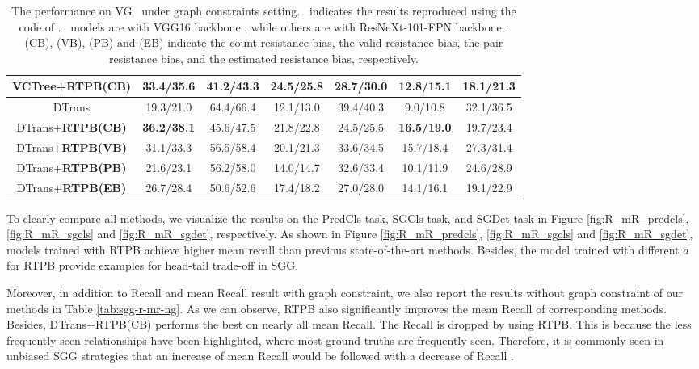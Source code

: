 \begin{table}[!ht]
\begin{tabular}{c|cc|cc|cc}
		VCTree+\textbf{RTPB(CB)  }               & 33.4/35.6     & 41.2/43.3    &\textbf{ 24.5/25.8}    & 28.7/30.0   & 12.8/15.1    & 18.1/21.3   \\ \hline
		DTrans                         & 19.3/21.0     & 64.4/66.4    & 12.1/13.0    & 39.4/40.3   & 9.0/10.8     & 32.1/36.5   \\
		DTrans+\textbf{RTPB(CB) }                & \textbf{36.2/38.1}    & 45.6/47.5    & 21.8/22.8    & 24.5/25.5   & \textbf{16.5/19.0}    & 19.7/23.4   \\
		DTrans+\textbf{RTPB(VB)}   & 31.1/33.3                    & 56.5/58.4                  & 20.1/21.3                 & 33.6/34.5 & 15.7/18.4 & 27.3/31.4 \\
		DTrans+\textbf{RTPB(PB)}         & 21.6/23.1        & 56.2/58.0       & 14.0/14.7    & 32.6/33.4   & 10.1/11.9    & 24.6/28.9   \\
		DTrans+\textbf{RTPB(EB)}                 & 26.7/28.4     & 50.6/52.6    & 17.4/18.2    & 27.0/28.0   & 14.1/16.1    & 19.1/22.9   \\
		
		\hline
	\end{tabular}
	\caption{ The performance on VG~\cite{krishna2016visual} under graph constraints setting. \dag~indicates the results reproduced using the code of \cite{Tang2020_unbiased}. \ddag~models are with VGG16 backbone \cite{simonyan2014very}, while others are with ResNeXt-101-FPN backbone \cite{Lin_2017_ICCV}. (CB), (VB), (PB) and (EB) indicate the count resistance bias, the valid resistance bias, the pair resistance bias, and the estimated resistance bias, respectively.}
	\label{tab:sgg-r-mr}
\end{table}
To clearly compare all methods, we visualize the results on the PredCls task, SGCls task, and SGDet task in Figure \ref{fig:R_mR_predcls}, \ref{fig:R_mR_sgcls} and \ref{fig:R_mR_sgdet}, respectively.  As shown in Figure \ref{fig:R_mR_predcls}, \ref{fig:R_mR_sgcls} and \ref{fig:R_mR_sgdet}, models trained with RTPB achieve higher mean recall than previous state-of-the-art methods. Besides, the model trained with different $a$ for RTPB provide examples for head-tail trade-off in SGG.

Moreover, in addition to Recall and mean Recall result with graph constraint, we also report the results without graph constraint of our methods in Table \ref{tab:sgg-r-mr-ng}. As we can observe, RTPB also significantly improves the mean Recall of corresponding methods. Besides, DTrans+RTPB(CB) performs the best on nearly all mean Recall. The Recall is dropped by using RTPB. This is because the less frequently seen relationships have been highlighted, where most ground truths are frequently seen. Therefore, it is commonly seen in unbiased SGG strategies that an increase of mean Recall would be followed with a decrease of Recall \cite{Tang2020_unbiased}. 

